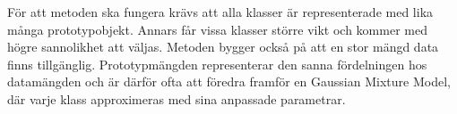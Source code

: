 \documentclass[../rapport_MVEX01-11-05]{subfiles}
\begin{document}
För att metoden ska fungera krävs att alla klasser är representerade med lika
många prototypobjekt. Annars får vissa klasser större vikt och kommer med högre
sannolikhet att väljas. Metoden bygger också på att en stor mängd data finns
tillgänglig. Prototypmängden representerar den sanna fördelningen hos datamängden
och är därför ofta att föredra framför en Gaussian Mixture Model, där varje klass
approximeras med sina anpassade parametrar.

%

\end{document}

